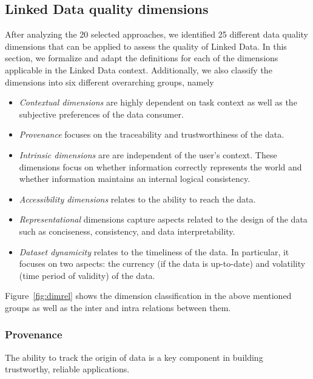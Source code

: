 \subsection{Linked Data quality dimensions}
\label{sec:dimensions}
After analyzing the 20 selected approaches, we identified 25 different data quality dimensions that can be applied to assess the quality of Linked Data. 
In this section, we formalize and adapt the definitions for each of the dimensions applicable in the Linked Data context.
Additionally, we also classify the dimensions into six different overarching groups, namely
\begin{itemize}
\item \textit{Contextual dimensions} are highly dependent on task context as well as the subjective preferences of the data consumer. %
\item \textit{Provenance} focuses on the traceability and trustworthiness of the data.
\item \textit{Intrinsic dimensions} are are independent of the user's context. 
These dimensions focus on whether information correctly represents the world and whether
information maintains an internal logical consistency. 
\item \textit{Accessibility dimensions} relates to the ability to reach the data. %
\item \textit{Representational} dimensions capture aspects related to the design of the data such as conciseness, consistency, and data interpretability. 
\item \textit{Dataset dynamicity} relates to the timeliness of the data. 
In particular, it focuses on two aspects: the currency (if the data is up-to-date) and volatility (time period of validity) of the data.
\end{itemize}

Figure~\ref{fig:dimrel} shows the dimension classification in the above mentioned groups as well as the inter and intra relations between them.

\subsubsection{Provenance}
The ability to track the origin of data is a key component in building trustworthy, reliable applications.


